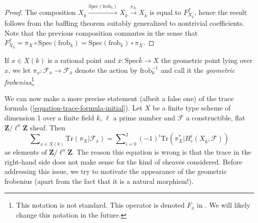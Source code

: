 \begin{proof}
The composition $X_{\bar k} \xrightarrow{\text{Spec}(\text{frob}_k)} X_{\bar k}
\xrightarrow{\pi_X} X_{\bar k}$ is equal to $F_{X_{\bar k}}^f$, hence the
result follows from the baffling theorem suitably generalized to nontrivial
coefficients. Note that the previous composition commutes in the sense that
$F_{X_{\bar k}}^f = \pi_X \circ \text{Spec}(\text{frob}_k) =
\text{Spec}(\text{frob}_k) \circ \pi_X$.
\end{proof}

\begin{definition}
\label{definition-geometric-frobenius-on-stalk}
If $x \in X(k)$ is a rational point and $\bar x : \text{Spec} \bar k \to X$ the
geometric point lying over $x$, we let $\pi_x : \mathcal{F}_{\bar x} \to
\mathcal{F}_{\bar x}$ denote the action by $\text{frob}_k^{-1}$ and call it the
{\it geometric frobenius}\footnote{This notation is not standard.
This operator is denoted $F_x$ in \cite{SGA4.5}. We will likely change
this notation in the future.}
\end{definition}

\noindent
We can now make a more precise statement (albeit a false one) of the trace
formula (\ref{equation-trace-formula-initial}). Let $X$ be a finite
type scheme of dimension 1
over a finite field $k$, $\ell$ a prime number and $\mathcal{F}$ a
constructible, flat $\mathbf{Z}/\ell^n\mathbf{Z}$ sheaf. Then
\begin{equation}
\label{equation-trace-formula-second}
\sum\nolimits_{x \in X(k)}
\text{Tr}(\pi_X | \mathcal{F}_{\bar x})
=
\sum\nolimits_{i=0}^2
(-1)^i \text{Tr}(\pi_X^* | H^i_c(X_{\bar k}, \mathcal{F}))
\end{equation}
as elements of $\mathbf{Z}/\ell^n\mathbf{Z}$. The reason this equation is wrong
is that the trace in the right-hand side does not make sense for the kind of
sheaves considered. Before addressing this issue, we try to motivate the
appearance of the geometric frobenius (apart from the fact that it is a natural
morphism!).


